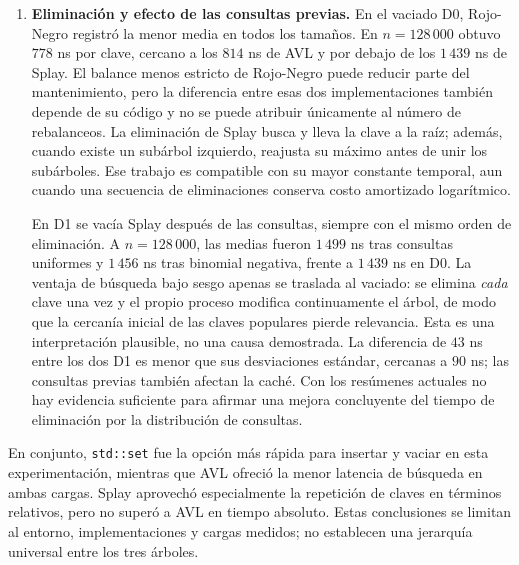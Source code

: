 \documentclass[11pt,letterpaper]{article}
\begin{document}
\begin{enumerate}
La concentración de consultas benefició la búsqueda de los tres árboles,
con el mayor cambio proporcional en Splay: a $n=128\,000$ su media se redujo
aproximadamente a la mitad frente a consultas uniformes. Sin embargo, ese
beneficio no le dio el menor tiempo absoluto de búsqueda. El patrón previo
de consultas produjo diferencias menores en el vaciado de Splay. Como las
figuras presentan desviaciones estándar y no una prueba de significancia,
no se atribuye causalmente esa pequeña diferencia a una reestructuración
ventajosa.
    \item \textbf{Eliminación y efecto de las consultas previas.} En el
    vaciado D0, Rojo-Negro registró la menor media en todos los tamaños. En
    $n=128\,000$ obtuvo $778$ ns por clave, cercano a los $814$ ns de AVL
    y por debajo de los $1\,439$ ns de Splay. El balance menos estricto de
    Rojo-Negro puede reducir parte del mantenimiento, pero la diferencia
    entre esas dos implementaciones también depende de su código y no se
    puede atribuir únicamente al número de rebalanceos. La eliminación de
    Splay busca y lleva la clave a la raíz; además, cuando existe un
    subárbol izquierdo, reajusta su máximo antes de unir los subárboles.
    Ese trabajo es compatible con su mayor constante temporal, aun cuando
    una secuencia de eliminaciones conserva costo amortizado logarítmico.

    En D1 se vacía Splay después de las consultas, siempre con el mismo
    orden de eliminación. A $n=128\,000$, las medias fueron $1\,499$ ns
    tras consultas uniformes y $1\,456$ ns tras binomial negativa, frente a
    $1\,439$ ns en D0. La ventaja de búsqueda bajo sesgo apenas se traslada
    al vaciado: se elimina \emph{cada} clave una vez y el propio proceso
    modifica continuamente el árbol, de modo que la cercanía inicial de
    las claves populares pierde relevancia. Esta es una interpretación
    plausible, no una causa demostrada. La diferencia de $43$ ns entre los
    dos D1 es menor que sus desviaciones estándar, cercanas a $90$ ns; las
    consultas previas también afectan la caché. Con los resúmenes actuales
    no hay evidencia suficiente para afirmar una mejora concluyente del
    tiempo de eliminación por la distribución de consultas.
\end{enumerate}

En conjunto, \texttt{std::set} fue la opción más rápida para insertar y
vaciar en esta experimentación, mientras que AVL ofreció la menor latencia de
búsqueda en ambas cargas. Splay aprovechó especialmente la repetición de
claves en términos relativos, pero no superó a AVL en tiempo absoluto.
Estas conclusiones se limitan al entorno, implementaciones y cargas
medidos; no establecen una jerarquía universal entre los tres árboles.
\end{document}
